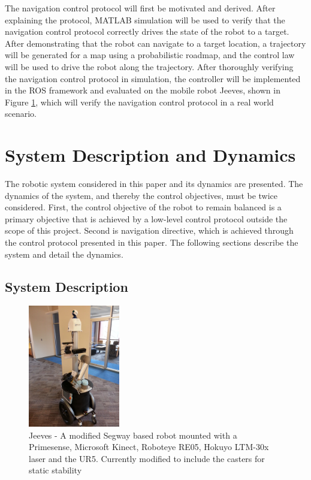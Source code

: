 \documentclass[journal]{IEEEtran}
\begin{document}
The navigation control protocol will first be motivated and derived. After explaining the protocol, MATLAB simulation will be used to verify that the navigation control protocol correctly drives the state of the robot to a target. After demonstrating that the robot can navigate to a target location, a trajectory will be generated for a map using a probabilistic roadmap, and the control law will be used to drive the robot along the trajectory. After thoroughly verifying the navigation control protocol in simulation, the controller will be implemented in the ROS framework and evaluated on the mobile robot Jeeves, shown in Figure \ref{fig:jeeves}, which will verify the navigation control protocol in a real world scenario.

\section{System Description and Dynamics}
The robotic system considered in this paper and its dynamics are presented. The dynamics of the system, and thereby the control objectives, must be twice considered. First, the control objective of the robot to remain balanced is a primary objective that is achieved by a low-level control protocol outside the scope of this project. Second is navigation directive, which is achieved through the control protocol presented in this paper. The following sections describe the system and detail the dynamics.
   
\subsection{System Description}
\begin{figure}
    \centering
    \includegraphics[width = 4cm, scale=0.2]{jeeves2_0.jpg}
    \caption{Jeeves - A modified Segway based robot mounted with a Primesense, Microsoft Kinect, Roboteye RE05, Hokuyo LTM-30x laser and the UR5. Currently modified to include the casters for static stability}
    \label{fig:jeeves}
\end{figure}
\end{document}
